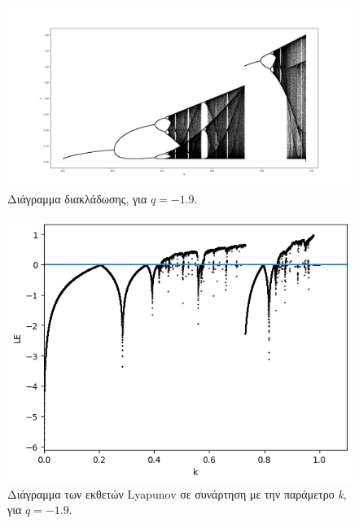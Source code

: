 \begin{figure}[h!]
	\centering
	\includegraphics[width=0.8\linewidth]{LateX images/graphs q19/g1}
	\caption{ Διάγραμμα διακλάδωσης, για $q=-1.9$.}
	\label{f:g39}
\end{figure}

\begin{figure}[h!]
	\centering
	\includegraphics[width=0.6\linewidth]{LateX images/graphs q19/g2}
	\caption{Διάγραμμα των εκθετών Lyapunov σε συνάρτηση με την παράμετρο \emph{k}, για $q=-1.9$.}
	\label{f:g40}
\end{figure}

